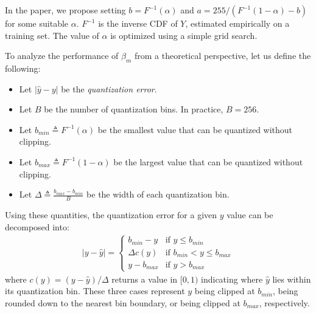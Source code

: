 \documentclass[]{article}
\begin{document}
In the paper, we propose setting $b = F^{-1}(\alpha)$ and $a = 255 / (F^{-1}(1 - \alpha) - b)$ for some suitable $\alpha$. $F^{-1}$ is the inverse CDF of $Y$, estimated empirically on a training set. The value of $\alpha$ is optimized using a simple grid search.

To analyze the performance of $\beta_m$ from a theoretical perspective, let us define the following:
\begin{itemize}
\itemsep1.5mm
\item{Let $|\hat{y} - y|$ be the \textit{quantization error}. }
\item{Let $B$ be the number of quantization bins. In practice, $B = 256$.}
\item{Let $b_{min} \triangleq F^{-1}(\alpha)$ be the smallest value that can be quantized without clipping.}
\item{Let $b_{max} \triangleq F^{-1}(1 - \alpha)$ be the largest value that can be quantized without clipping.}
\item{Let $\Delta \triangleq \frac{b_{max} - b_{min} }{ B }$ be the width of each quantization bin.}
\end{itemize}

Using these quantities, the quantization error for a given $y$ value can be decomposed into:
\begin{align} \label{eq:decomposition}
    |y - \hat{y}| =
    \begin{cases}
        b_{min} - y         & \text{if } y \le b_{min} \\
        \Delta c(y)         & \text{if } b_{min} < y \le b_{max} \\
        y - b_{max}         & \text{if } y > b_{max}
    \end{cases}
\end{align}
where $c(y) = (y - \hat{y}) / \Delta$ returns a value in $[0, 1)$ indicating where $\hat{y}$ lies within its quantization bin. These three cases represent $y$ being clipped at $b_{min}$, being rounded down to the nearest bin boundary, or being clipped at $b_{max}$, respectively.
\end{document}
